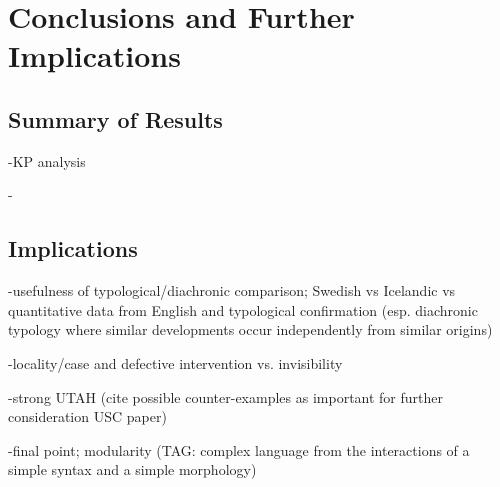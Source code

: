 \chapter{Conclusions and Further Implications}
\section{Summary of Results}
-KP analysis

-
\section{Implications}
-usefulness of typological/diachronic comparison; Swedish vs Icelandic vs quantitative data from English and typological confirmation (esp. diachronic typology where similar developments occur independently from similar origins)

-locality/case and defective intervention vs. invisibility

-strong UTAH (cite possible counter-examples as important for further consideration USC paper)

-final point; modularity (TAG: complex language from the interactions of a simple syntax and a simple morphology)


